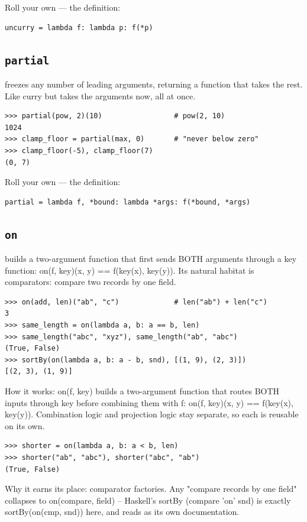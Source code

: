 \documentclass[10pt,letterpaper]{book}
\begin{document}
Roll your own --- the definition:

\begin{lstlisting}[style=ex]
uncurry = lambda f: lambda p: f(*p)
\end{lstlisting}
\subsection{\texttt{partial}}\label{def:partial}
freezes any number of leading arguments, returning a function that takes the rest. Like curry but takes the arguments now, all at once.
\begin{lstlisting}[style=ex]
>>> partial(pow, 2)(10)                 # pow(2, 10)
1024
>>> clamp_floor = partial(max, 0)       # "never below zero"
>>> clamp_floor(-5), clamp_floor(7)
(0, 7)
\end{lstlisting}

Roll your own --- the definition:

\begin{lstlisting}[style=ex]
partial = lambda f, *bound: lambda *args: f(*bound, *args)
\end{lstlisting}
\subsection{\texttt{on}}\label{def:on}
builds a two-argument function that first sends BOTH arguments through a key function: on(f, key)(x, y) == f(key(x), key(y)). Its natural habitat is comparators: compare two records by one field.
\begin{lstlisting}[style=ex]
>>> on(add, len)("ab", "c")             # len("ab") + len("c")
3
>>> same_length = on(lambda a, b: a == b, len)
>>> same_length("abc", "xyz"), same_length("ab", "abc")
(True, False)
>>> sortBy(on(lambda a, b: a - b, snd), [(1, 9), (2, 3)])
[(2, 3), (1, 9)]
\end{lstlisting}

How it works: on(f, key) builds a two-argument function that routes BOTH inputs through key before combining them with f: on(f, key)(x, y) == f(key(x), key(y)). Combination logic and projection logic stay separate, so each is reusable on its own.

\begin{lstlisting}[style=ex]
>>> shorter = on(lambda a, b: a < b, len)
>>> shorter("ab", "abc"), shorter("abc", "ab")
(True, False)
\end{lstlisting}

Why it earns its place: comparator factories. Any "compare records by one field" collapses to on(compare, field) -- Haskell's sortBy (compare 'on' snd) is exactly sortBy(on(cmp, snd)) here, and reads as its own documentation.
\end{document}
